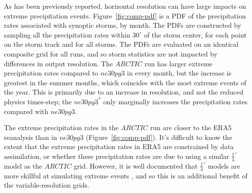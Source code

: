 \documentclass[draft]{agujournal2019}
\begin{document}
As has been previously reported, horizontal resolution can have large impacts on extreme precipitation events. Figure~\ref{fig:comp-pdf} is a PDF of the precipitation rates associated with synoptic storms, by month. The PDFs are constructed by sampling all the precipitation rates within $30^{\circ}$ of the storm center, for each point on the storm track and for all storms. The PDFs are evaluated on an identical composite grid for all runs, and so storm statistics are not impacted by differences in output resolution. The $ARCTIC$ run has larger extreme precipitation rates compared to $ne30pg3$ in every month, but the increase is greatest in the summer months, which coincides with the most extreme events of the year. This is primarily due to an increase in resolution, and not the reduced physics times-step; the $ne30pg3^{*}$ only marginally increases the precipitation rates compared with $ne30pg3$.

The extreme precipitation rates in the $ARCTIC$ run are closer to the ERA5 reanalysis than in $ne30pg3$ (Figure~\ref{fig:comp-pdf}). It's difficult to know the extent that the extreme precipitation rates in ERA5 are constrained by data assimilation, or whether these precipitation rates are due to using a similar $\frac{1}{4}^{\circ}$ model as the $ARCTIC$ grid. However, it is well documented that $\frac{1}{4}^{\circ}$ models are more skillful at simulating extreme events \cite{BetAl2013JC,OETAL2016JAMES}, and so this is an additional benefit of the variable-resolution grids.
\end{document}
